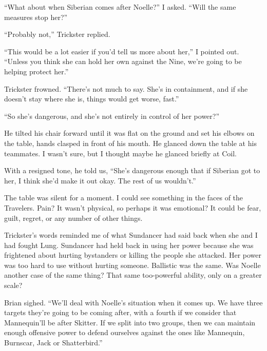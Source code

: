 ``What about when Siberian comes after Noelle?'' I asked.  ``Will the same measures stop her?''



``Probably not,'' Trickster replied.



``This would be a lot easier if you'd tell us more about her,'' I pointed out.  ``Unless you think she can hold her own against the Nine, we're going to be helping protect her.''



Trickster frowned.  ``There's not much to say.  She's in containment, and if she doesn't stay where she is, things would get worse, fast.''



``So she's dangerous, and she's not entirely in control of her power?''



He tilted his chair forward until it was flat on the ground and set his elbows on the table, hands clasped in front of his mouth.  He glanced down the table at his teammates.  I wasn't sure, but I thought maybe he glanced briefly at Coil.



With a resigned tone, he told us, ``She's dangerous enough that if Siberian got to her, I think she'd make it out okay.  The rest of us wouldn't.''



The table was silent for a moment.  I could see something in the faces of the Travelers.  Pain?  It wasn't physical, so perhaps it was emotional?  It could be fear, guilt, regret, or any number of other things.



Trickster's words reminded me of what Sundancer had said back when she and I had fought Lung.  Sundancer had held back in using her power because she was frightened about hurting bystanders or killing the people she attacked.  Her power was too hard to use without hurting someone.  Ballistic was the same.  Was Noelle another case of the same thing?  That same too-powerful ability, only on a greater scale?



Brian sighed.  ``We'll deal with Noelle's situation when it comes up.  We have three targets they're going to be coming after, with a fourth if we consider that Mannequin'll be after Skitter.  If we split into two groups, then we can maintain enough offensive power to defend ourselves against the ones like Mannequin, Burnscar, Jack or Shatterbird.''



